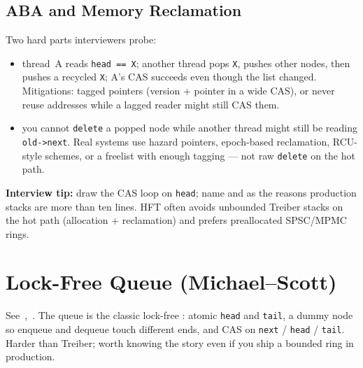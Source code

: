 \subsection{ABA and Memory Reclamation}
\label{subsec:treiber-aba}
Two hard parts interviewers probe:
\begin{itemize}
    \item {} thread~A reads \texttt{head == X}; another thread pops 
          \texttt{X}, pushes other nodes, then pushes a recycled \texttt{X}; A's CAS 
          succeeds even though the list changed. Mitigations: tagged pointers 
          (version + pointer in a wide CAS), or never reuse addresses while a 
          lagged reader might still CAS them.
    \item {} you cannot \texttt{delete} a popped node 
          while another thread might still be reading \texttt{old->next}. Real systems 
          use hazard pointers, epoch-based reclamation, RCU-style schemes, or a 
          freelist with enough tagging --- not raw \texttt{delete} on the hot path.
\end{itemize}
\par\noindent\textbf{Interview tip:} draw the CAS loop on \texttt{head}; name 
 and  as the reasons production stacks are 
more than ten lines. HFT often avoids unbounded Treiber stacks on the hot path 
(allocation + reclamation) and prefers preallocated SPSC/MPMC rings.

\section{Lock-Free Queue (Michael--Scott)}
\label{sec:michael-scott-queue}
See~\cite{wiki-michael-scott-queue},~\cite{michael-scott-1996}. The 
 queue is the classic lock-free : 
atomic \texttt{head} and \texttt{tail}, a dummy node so enqueue and dequeue touch 
different ends, and CAS on \texttt{next} / \texttt{head} / \texttt{tail}.
\newline
Harder than Treiber; worth knowing the story even if you ship a bounded ring in 
production.

